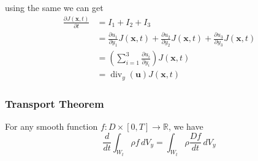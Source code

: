 using the same we can get 
\begin{equation}
\begin{aligned}
\frac{\partial J(\textbf{x},t)}{\partial t}
&= I_1 + I_2 + I_3 \\
&= \frac{\partial u_1}{\partial y_1} J (\textbf{x},t)
+ \frac{\partial u_2}{\partial y_2} J (\textbf{x},t)
+ \frac{\partial u_3}{\partial y_3} J (\textbf{x},t)\\
&= \left(\sum_{i=1}^{3} \frac{\partial u_i}{\partial y_i}\right) J (\textbf{x},t)\\
&= \operatorname{div}_{y} \left(\textbf{u}\right) J (\textbf{x},t)
\end{aligned}
\end{equation}


\subsubsection{Transport Theorem} %

For any smooth function $f:D\times [0,T] \to \mathbb{R}$, we have
\begin{equation}
\frac{d}{dt}\int_{W_t} \rho f \,dV_y = \int_{W_t} \rho \frac{Df}{dt} \,dV_y
\end{equation}



